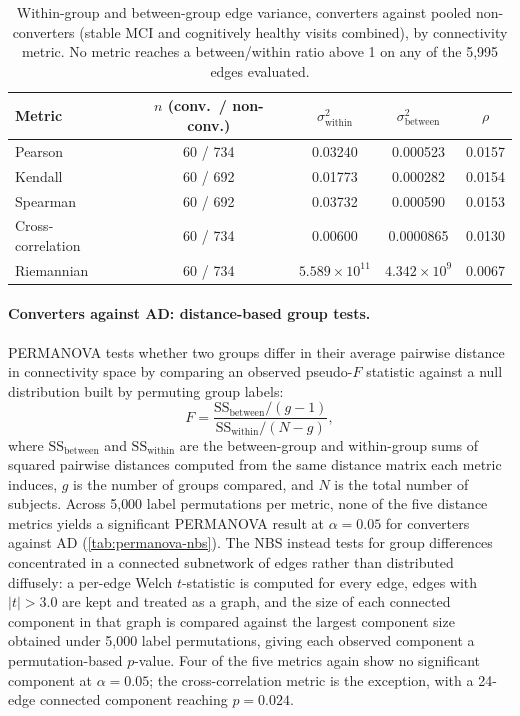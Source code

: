\begin{table}[htbp]
  \centering
  \small
  \caption{Within-group and between-group edge variance, converters against pooled
  non-converters (stable \ac{MCI} and cognitively healthy visits combined), by connectivity
  metric. No metric reaches a between/within ratio above 1 on any of the 5{,}995 edges
  evaluated.}
  \label{tab:variance-ratio}
  \begin{tabular*}{\textwidth}{@{\extracolsep{\fill}}lcccc@{}}
    \toprule
    Metric & $n$ (conv.\ / non-conv.) & $\sigma^2_{\text{within}}$ & $\sigma^2_{\text{between}}$ & $\rho$ \\
    \midrule
    Pearson & 60 / 734 & 0.03240 & 0.000523 & 0.0157 \\
    Kendall & 60 / 692 & 0.01773 & 0.000282 & 0.0154 \\
    Spearman & 60 / 692 & 0.03732 & 0.000590 & 0.0153 \\
    Cross-correlation & 60 / 734 & 0.00600 & 0.0000865 & 0.0130 \\
    Riemannian & 60 / 734 & $5.589 \times 10^{11}$ & $4.342 \times 10^{9}$ & 0.0067 \\
    \bottomrule
  \end{tabular*}
\end{table}

\paragraph{Converters against \ac{AD}: distance-based group tests.} \ac{PERMANOVA} tests whether
two groups differ in their average pairwise distance in connectivity space by comparing an
observed pseudo-$F$ statistic against a null distribution built by permuting group labels:
\[
  F = \frac{\mathrm{SS}_{\text{between}} / (g - 1)}{\mathrm{SS}_{\text{within}} / (N - g)},
\]
where $\mathrm{SS}_{\text{between}}$ and $\mathrm{SS}_{\text{within}}$ are the between-group
and within-group sums of squared pairwise distances computed from the same distance matrix
each metric induces, $g$ is the number of groups compared, and $N$ is the total number of
subjects. Across 5{,}000 label permutations per metric, none of the five distance metrics
yields a significant \ac{PERMANOVA} result at $\alpha = 0.05$ for converters against
\ac{AD} (\autoref{tab:permanova-nbs}). The \ac{NBS} instead tests for group differences
concentrated in a connected subnetwork of edges rather than distributed diffusely: a
per-edge Welch $t$-statistic is computed for every edge, edges with $|t| > 3.0$ are kept and
treated as a graph, and the size of each connected component in that graph is compared
against the largest component size obtained under 5{,}000 label permutations, giving each
observed component a permutation-based $p$-value. Four of the five metrics again show no
significant component at $\alpha = 0.05$; the cross-correlation metric is the exception, with
a 24-edge connected component reaching $p = 0.024$.

